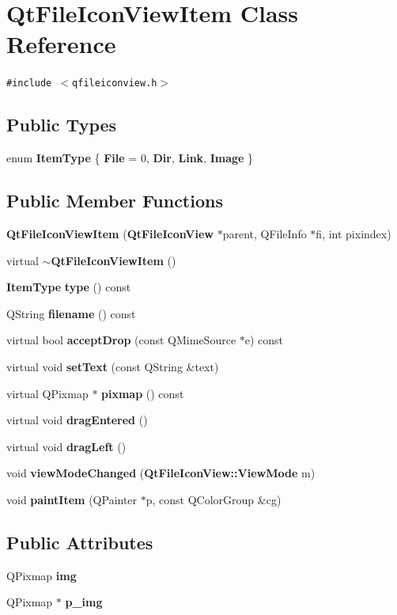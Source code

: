 \section{Qt\-File\-Icon\-View\-Item Class Reference}
\label{classQtFileIconViewItem}
{\tt \#include $<$qfileiconview.h$>$}

\subsection*{Public Types}
\begin{CompactItemize}
\item 
enum {\bf Item\-Type} \{ {\bf File} =  0, 
{\bf Dir}, 
{\bf Link}, 
{\bf Image}
 \}
\end{CompactItemize}
\subsection*{Public Member Functions}
\begin{CompactItemize}
\item 
{\bf Qt\-File\-Icon\-View\-Item} ({\bf Qt\-File\-Icon\-View} $\ast$parent, QFile\-Info $\ast$fi, int pixindex)
\item 
virtual {\bf $\sim$Qt\-File\-Icon\-View\-Item} ()
\item 
{\bf Item\-Type} {\bf type} () const 
\item 
QString {\bf filename} () const 
\item 
virtual bool {\bf accept\-Drop} (const QMime\-Source $\ast$e) const 
\item 
virtual void {\bf set\-Text} (const QString \&text)
\item 
virtual QPixmap $\ast$ {\bf pixmap} () const 
\item 
virtual void {\bf drag\-Entered} ()
\item 
virtual void {\bf drag\-Left} ()
\item 
void {\bf view\-Mode\-Changed} ({\bf Qt\-File\-Icon\-View::View\-Mode} m)
\item 
void {\bf paint\-Item} (QPainter $\ast$p, const QColor\-Group \&cg)
\end{CompactItemize}
\subsection*{Public Attributes}
\begin{CompactItemize}
\item 
QPixmap {\bf img}
\item 
QPixmap $\ast$ {\bf p\_\-img}
\end{CompactItemize}
